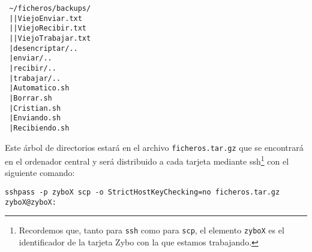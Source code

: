 \documentclass[12pt,letterpaper]{article}
\begin{document}
\texttt{
\textasciitilde/ficheros/backups/\\
\textcolor{white}{.}\hspace{3.15cm}|\hspace{1.8cm}|ViejoEnviar.txt\\
\textcolor{white}{.}\hspace{3.15cm}|\hspace{1.8cm}|ViejoRecibir.txt\\
\textcolor{white}{.}\hspace{3.15cm}|\hspace{1.8cm}|ViejoTrabajar.txt\\
\textcolor{white}{.}\hspace{3.15cm}|desencriptar/..\\
\textcolor{white}{.}\hspace{3.15cm}|enviar/..\\
\textcolor{white}{.}\hspace{3.15cm}|recibir/..\\
\textcolor{white}{.}\hspace{3.15cm}|trabajar/..\\
\textcolor{white}{.}\hspace{3.15cm}|Automatico.sh\\
\textcolor{white}{.}\hspace{3.15cm}|Borrar.sh\\
\textcolor{white}{.}\hspace{3.15cm}|Cristian.sh\\
\textcolor{white}{.}\hspace{3.15cm}|Enviando.sh\\
\textcolor{white}{.}\hspace{3.15cm}|Recibiendo.sh\\
}

Este árbol de directorios estará en el archivo \texttt{ficheros.tar.gz} que se encontrará en el ordenador central y será distribuido a cada tarjeta mediante ssh\footnote{Recordemos que, tanto para \texttt{ssh} como para \texttt{scp}, el elemento \texttt{zyboX} es el identificador de la tarjeta Zybo con la que estamos trabajando.} con el siguiente comando:
\begin{center}
	\texttt{sshpass -p zyboX scp -o StrictHostKeyChecking=no ficheros.tar.gz zyboX@zyboX:}
\end{center}
\end{document}
